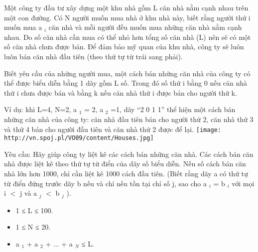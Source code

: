 Một công ty đầu tư xây dựng một khu nhà gồm L căn nhà nằm cạnh nhau trên một con đường. Có N người muốn mua nhà ở khu nhà này, biết rằng người thứ i muốn mua a        $_         i        $        căn nhà và mỗi người đều muốn mua những căn nhà nằm cạnh nhau. Do số căn nhà cần mua có thể nhỏ hơn tổng số căn nhà (L) nên sẽ có một số căn nhà chưa được bán. Để đảm bảo mỹ quan của khu nhà, công ty sẽ luôn luôn bán căn nhà đầu tiên (theo thứ tự từ trái sang phải).       

        Biết yêu cầu của những người mua, một cách bán những căn nhà của công ty có thể được biểu diễn bằng 1 dãy gồm L số. Trong đó số thứ i bằng 0 nếu căn nhà thứ i chưa được bán và bằng k nếu căn nhà thứ i được bán cho người thứ k.       

        Ví dụ: khi L=4, N=2, a        $_         1        $        = 2, a        $_         2        $        =1, dãy “2 0 1 1” thể hiện một cách bán những căn nhà của công ty: căn nhà đầu tiên bán cho người thứ 2, căn nhà thứ 3 và thứ 4 bán cho người đầu tiên và căn nhà thứ 2 được để lại.       
\texttt{[image: http://vn.spoj.pl/VO09/content/Houses.jpg]}



   Yêu cầu: Hãy giúp công ty liệt kê các cách bán những căn nhà. Các cách bán căn nhà được liệt kê theo thứ tự từ điển của dãy số biểu diễn. Nếu số cách bán căn nhà lớn hơn 1000, chỉ cần liệt kê 1000 cách đầu tiên. (Biết rằng dãy a có thứ tự từ điển đứng trước dãy b nếu và chỉ nếu tồn tại chỉ số j, sao cho a   $_    i   $   = b   $_    i   $   với mọi i $<$ j và a   $_    j   $   $<$ b   $_    j   $   ).  

\begin{itemize}
	\item     1 ≤ L ≤ 100.   
	\item     1 ≤ N ≤ 20.   
	\item     a    $_     1    $    + a    $_     2    $    + ... + a    $_     N    $    ≤ L.   
\end{itemize}